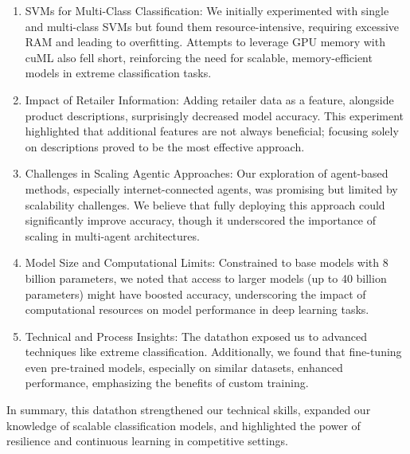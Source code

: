 \documentclass[9pt,a4paper,twoside]{rho-class/rho}
\begin{document}
\begin{enumerate}
    \item SVMs for Multi-Class Classification: 
    We initially experimented with single and multi-class SVMs but found them resource-intensive, requiring excessive RAM and leading to overfitting. Attempts to leverage GPU memory with cuML also fell short, reinforcing the need for scalable, memory-efficient models in extreme classification tasks.

    \item Impact of Retailer Information: 
    Adding retailer data as a feature, alongside product descriptions, surprisingly decreased model accuracy. This experiment highlighted that additional features are not always beneficial; focusing solely on descriptions proved to be the most effective approach.

    \item Challenges in Scaling Agentic Approaches: 
    Our exploration of agent-based methods, especially internet-connected agents, was promising but limited by scalability challenges. We believe that fully deploying this approach could significantly improve accuracy, though it underscored the importance of scaling in multi-agent architectures.

    \item Model Size and Computational Limits: 
    Constrained to base models with 8 billion parameters, we noted that access to larger models (up to 40 billion parameters) might have boosted accuracy, underscoring the impact of computational resources on model performance in deep learning tasks.
    
    \item Technical and Process Insights: 
    The datathon exposed us to advanced techniques like extreme classification. Additionally, we found that fine-tuning even pre-trained models, especially on similar datasets, enhanced performance, emphasizing the benefits of custom training.

\end{enumerate}

In summary, this datathon strengthened our technical skills, expanded our knowledge of scalable classification models, and highlighted the power of resilience and continuous learning in competitive settings.
\end{document}
